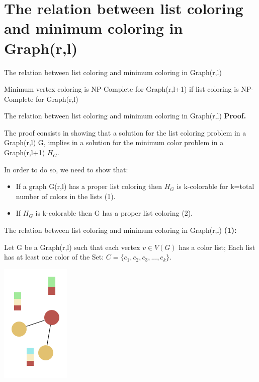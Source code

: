 \documentclass[9pt, compress]{beamer}
\begin{document}
    \section{The relation between list coloring and minimum coloring in Graph(r,l)}
    \begin{frame}{The relation between list coloring and minimum coloring in Graph(r,l)}
        \begin{theorem}
          Minimum vertex coloring is NP-Complete for Graph(r,l+1) if list coloring is NP-Complete for Graph(r,l)
        \end{theorem}
    \end{frame}
    \begin{frame}{The relation between list coloring and minimum coloring in Graph(r,l)}
        \textbf{Proof.}
        
        The proof consists in showing that a solution for the list coloring problem in a Graph(r,l) G, implies in a solution for the minimum color problem in a Graph(r,l+1) $H_G$.
        
        In order to do so, we need to show that:
          \begin{itemize}
        \item If a graph G(r,l) has a proper list coloring then $H_G$ is k-colorable for k=total number of colors in the lists (1).
        \item If $H_G$ is k-colorable then G has a proper list coloring (2).
      \end{itemize}
    \end{frame}
    \begin{frame}{The relation between list coloring and minimum coloring in Graph(r,l)}
      \textbf{(1):}
      
      Let G be a Graph(r,l) such that each vertex $v \in V(G)$ has a color list; 
      Each list has at least one color of the Set: $C = \{c_1,c_2,c_3,...,c_k \}$. 
      \begin{center}
        \includegraphics[scale=0.4]{../figuras/presentation-G.png}
      \end{center}
    \end{frame}
\end{document}
